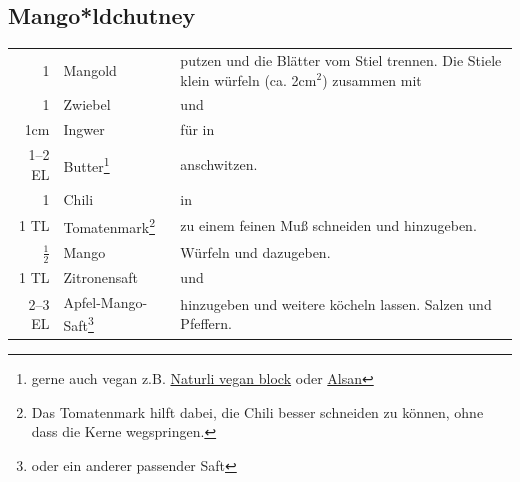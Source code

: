 \subsection*{Mango*ldchutney}\label{subsec:chutney}
\begin{longtable}{rlL{16.2cm}}
    1               &   Mangold         &   putzen und die Blätter vom Stiel trennen.
                                            Die Stiele klein würfeln (ca. 2cm$^2$) zusammen mit \\
    1               &   Zwiebel         &   und \\
    1cm             &   Ingwer          &   für  in  \\
    1--2 EL         &   Butter\footnote{gerne auch vegan z.B. \href{https://www.bio123.de/produkt/naturli/naturli-organic-vegan-block-200g}{Naturli vegan block}
									        oder \href{https://www.alsan.de/alsan-bio/}{Alsan}}
                                        &   anschwitzen.    \\
    1               &   Chili           &   in \\
    1 TL            &   Tomatenmark\footnote{Das Tomatenmark hilft dabei, die Chili besser schneiden zu können, ohne dass die Kerne wegspringen.}
                                        &   zu einem feinen Muß schneiden und hinzugeben.   \\
    $\frac{1}{2}$   &   Mango           &   Würfeln und dazugeben.  \\
    1 TL            &   Zitronensaft    &   und \\
    2--3 EL         &   Apfel-Mango-Saft\footnote{oder ein anderer passender Saft}
                                        &   hinzugeben und weitere  köcheln lassen.
                                            Salzen und Pfeffern.    \\
\end{longtable}

